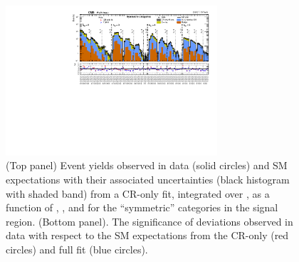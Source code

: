\begin{figure}[!h]
  \begin{center}
    \includegraphics[angle=90,width=0.7\textwidth]{summaryPlot_Symmetric_prefit_overlay_fit_b_CRFit}
    \caption{(Top panel) Event yields observed in data (solid circles)
      and SM expectations with their associated uncertainties (black
      histogram with shaded band) from a CR-only fit, integrated over
      \HTmiss, as a function of \njet, \nb, and \scalht for the
      ``symmetric'' \njet categories in the signal region. (Bottom
      panel). The significance of deviations observed in data with
      respect to the SM expectations from the CR-only (red circles)
      and full fit (blue circles).  }
    \label{fig:sym}
  \end{center}
\end{figure}

